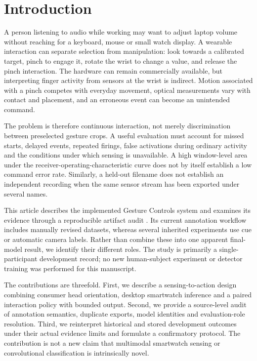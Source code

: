 \section{Introduction}\label{introduction}

A person listening to audio while working may want to adjust laptop volume without reaching for a keyboard, mouse or small watch display. A wearable interaction can separate selection from manipulation: look towards a calibrated target, pinch to engage it, rotate the wrist to change a value, and release the pinch interaction. The hardware can remain commercially available, but interpreting finger activity from sensors at the wrist is indirect. Motion associated with a pinch competes with everyday movement, optical measurements vary with contact and placement, and an erroneous event can become an unintended command.

The problem is therefore continuous interaction, not merely discrimination between preselected gesture crops. A useful evaluation must account for missed starts, delayed events, repeated firings, false activations during ordinary activity and the conditions under which sensing is unavailable. A high window-level area under the receiver-operating-characteristic curve does not by itself establish a low command error rate. Similarly, a held-out filename does not establish an independent recording when the same sensor stream has been exported under several names.

This article describes the implemented Gesture Controls system and examines its evidence through a reproducible artifact audit \cite{repository}. Its current annotation workflow includes manually revised datasets, whereas several inherited experiments use cue or automatic camera labels. Rather than combine these into one apparent final-model result, we identify their different roles. The study is primarily a single-participant development record; no new human-subject experiment or detector training was performed for this manuscript.

The contributions are threefold. First, we describe a sensing-to-action design combining consumer head orientation, desktop smartwatch inference and a paired interaction policy with bounded output. Second, we provide a source-level audit of annotation semantics, duplicate exports, model identities and evaluation-role resolution. Third, we reinterpret historical and stored development outcomes under their actual evidence limits and formulate a confirmatory protocol. The contribution is not a new claim that multimodal smartwatch sensing or convolutional classification is intrinsically novel.

